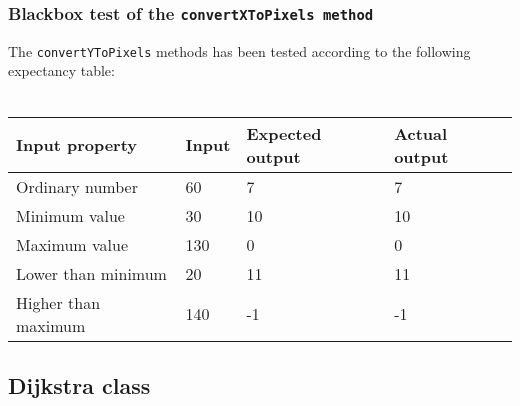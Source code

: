 \documentclass[a4paper,11pt]{article}
\begin{document}
\subsubsection{Blackbox test of the \texttt{convertXToPixels method}}
The \texttt{convertYToPixels} methods has been tested according to the following expectancy table: \\ \\
\begin{tabular}{ p{3.5cm} | p{2.5cm} | p{2.5cm} | p{2.5cm} }
	Input property & Input & Expected output & Actual output \\
	\hline
	Ordinary number & 60 & 7 & 7 \\
	Minimum value & 30 & 10 & 10 \\
	Maximum value & 130 & 0 & 0 \\
	Lower than minimum & 20 & 11 & 11 \\
	Higher than maximum & 140 & -1 & -1
\end{tabular}

\pagebreak
\subsection{Dijkstra class}

\pagebreak
\end{document}

